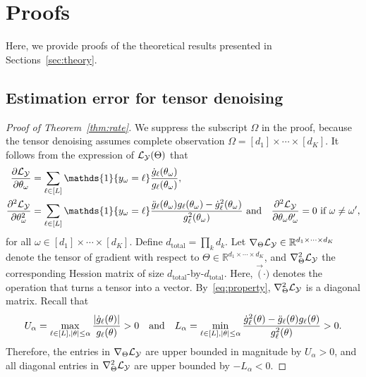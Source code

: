 \documentclass{article}
\theoremstyle{plain}
\theoremstyle{definition}
\begin{document}
\appendix
\onecolumn




\section{Proofs}\label{sec:proof}
Here, we provide proofs of the theoretical results presented in Sections~\ref{sec:theory}.

\subsection{Estimation error for tensor denoising}\label{sec:proofMSE}
\begin{proof}[Proof of Theorem~\ref{thm:rate}]
We suppress the subscript $\Omega$ in the proof, because the tensor denoising assumes complete observation $\Omega=[d_1]\times \cdots \times [d_K]$. It follows from the expression of $\mathcal{L}_{\mathcal{Y}}(\Theta)$ that
\begin{align}\label{eq:property}
{\partial \flogl\over \partial \theta_\omega}&=\sum_{\ell\in[L]}\mathds{1}\{y_{\omega}=\ell\}
{\dot{g}_\ell(\theta_\omega)\over g_\ell(\theta_\omega)},\notag\\
{\partial^2 \flogl\over \partial \theta_\omega^2}&=\sum_{\ell\in[L]}\mathds{1}\{y_\omega=\ell\}{\ddot{g}_\ell(\theta_\omega)g_\ell(\theta_\omega)-\dot{g}^2_\ell(\theta_\omega)\over g^2_\ell(\theta_\omega)}\ \text{and}\quad
{\partial^2 \flogl\over \partial \theta_\omega \theta_\omega'}=0\ \text{if}\ \omega\neq \omega',
\end{align}
for all $\omega\in[d_1]\times \cdots \times [d_K]$.
Define $d_{\text{total}}=\prod_k d_k$. Let $\nabla_{\Theta}\mathcal{L}_{\mathcal{Y}}\in\mathbb{R}^{d_1\times\cdots\times d_K}$ denote the tensor of gradient with respect to $\Theta\in\mathbb{R}^{d_1\times \cdots\times d_K}$, and $\nabla^2_{\Theta}\mathcal{L}_{\mathcal{Y}}$ the corresponding Hession matrix of size $d_\text{total}$-by-$d_{\text{total}}$. Here, $\Vec(\cdot)$ denotes the operation that turns a tensor into a vector. By~\eqref{eq:property}, $\nabla^2_{\Theta}\mathcal{L}_{\mathcal{Y}}$ is a diagonal matrix. Recall that
\begin{equation}\label{eq:bound}
U_\alpha=\max_{\ell\in[L],|\theta|\leq \alpha}{|\dot{g}_\ell(\theta)|\over g_\ell(\theta)}>0 \quad \text{and}\quad
L_\alpha=\min_{\ell\in[L],|\theta|\leq \alpha} {\dot{g}^2_\ell(\theta)-\ddot{g}_\ell(\theta)g_\ell(\theta)\over g^2_\ell(\theta)}>0.
\end{equation}
Therefore, the entries in $\nabla_{\Theta}\mathcal{L}_{\mathcal{Y}}$ are upper bounded in magnitude by $U_\alpha>0$, and all diagonal entries in $\nabla^2_{\Theta}\mathcal{L}_{\mathcal{Y}}$ are upper bounded by $-L_{\alpha}<0$.


\end{proof}
\end{document}
